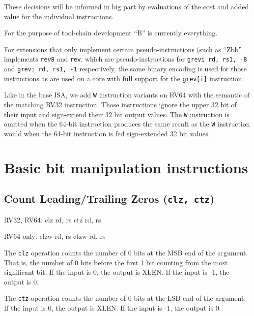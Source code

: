 These decisions will be informed in big part by evaluations of the cost and
added value for the individual instructions.

For the purpose of tool-chain development ``B'' is currently everything.

For extensions that only implement certain pseudo-instructions (such as ``Zbb''
implements {\tt rev8} and {\tt rev}, which are pseudo-instructions for {\tt grevi rd, rs1, -8}
and {\tt grevi rd, rs1, -1} respectively, the same binary encoding is used for those
instructions as are used on a core with full support for the {\tt grev[i]} instruction.

Like in the base ISA, we add {\tt *W} instruction variants on RV64 with the
semantic of the matching RV32 instruction. Those instructions ignore the upper
32 bit of their input and sign-extend their 32 bit output values. The {\tt *W}
instruction is omitted when the 64-bit instruction produces the same result as
the {\tt *W} instruction would when the 64-bit instruction is fed sign-extended
32 bit values.


\section{Basic bit manipulation instructions}


\subsection{Count Leading/Trailing Zeros (\texttt{clz, ctz})}

\begin{rvb}
  RV32, RV64:
    clz rd, rs
    ctz rd, rs

  RV64 only:
    clzw rd, rs
    ctzw rd, rs
\end{rvb}

The {\tt clz} operation counts the number of 0 bits at the MSB end of the
argument.  That is, the number of 0 bits before the first 1 bit counting from
the most significant bit. If the input is 0, the output is XLEN. If the input
is -1, the output is 0.

The {\tt ctz} operation counts the number of 0 bits at the LSB end of the
argument. If the input is 0, the output is XLEN. If the input is -1, the
output is 0.

